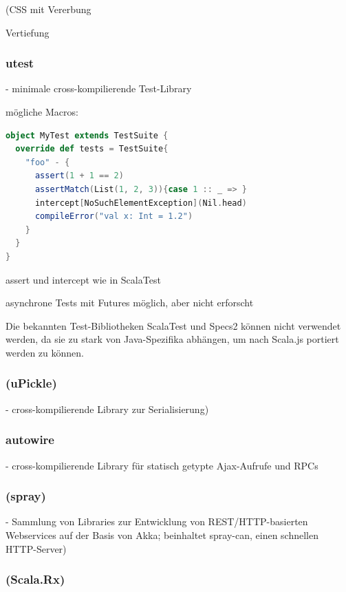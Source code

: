 \documentclass[a4paper, 12pt, hidelinks, listof=totoc, listoftables=totoc, bibliography=totoc]{scrreprt}
\begin{document}
(CSS mit Vererbung

Vertiefung


\subsubsection{utest}

- minimale cross-kompilierende Test-Library

mögliche Macros:
\begin{lstlisting}[language=Scala]
object MyTest extends TestSuite {
  override def tests = TestSuite{
    "foo" - {
      assert(1 + 1 == 2)
      assertMatch(List(1, 2, 3)){case 1 :: _ => }
      intercept[NoSuchElementException](Nil.head)
      compileError("val x: Int = 1.2")
    }
  }
}
\end{lstlisting}

assert und intercept wie in ScalaTest


asynchrone Tests mit Futures möglich, aber nicht erforscht

Die bekannten Test-Bibliotheken ScalaTest und Specs2 können nicht verwendet werden, da sie zu stark von Java-Spezifika abhängen, um nach Scala.js portiert werden zu können\cite[\#OtherTestingLibraries]{haoyi.HOS}.


\subsubsection{(uPickle)}

- cross-kompilierende Library zur Serialisierung)


\subsubsection{autowire}

- cross-kompilierende Library für statisch getypte Ajax-Aufrufe und RPCs

\subsubsection{(spray)}

- Sammlung von Libraries zur Entwicklung von REST/HTTP-basierten Webservices auf der Basis von Akka; beinhaltet spray-can, einen schnellen HTTP-Server)

\subsubsection{(Scala.Rx)}
\end{document}
